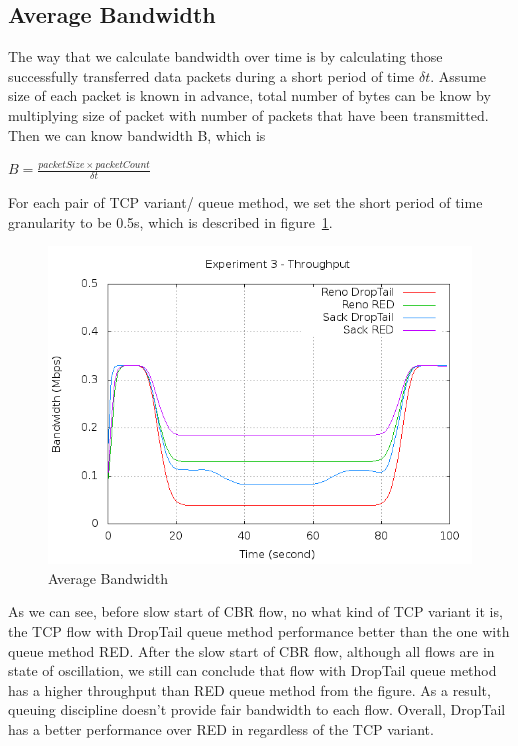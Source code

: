 \documentclass[10pt, conference]{lib/IEEEtran}
\begin{document}
\subsection{Average Bandwidth}
The way that we calculate bandwidth over time is by calculating those 
successfully transferred data packets during a short period of time 
$\delta t$. Assume size of each packet is known in advance, total 
number of bytes can be know by multiplying size of packet with number 
of packets that have been transmitted. Then we can know bandwidth B, 
which is  
\begin{center}
    $B = \frac{packetSize \times packetCount}{\delta t}$
\end{center}
For each pair of TCP variant/ queue method, we set the short period of time granularity to be 0.5s, which is described in figure~\ref{fig:exp3-thp}.\\
\begin{figure}[!htb]
    \centering
    \includegraphics[width=1.0\linewidth]{plot/exp3-thp.png}
    \caption{Average Bandwidth}
    \label{fig:exp3-thp}
\end{figure}
As we can see, before slow start of CBR flow, no what kind of TCP 
variant it is, the TCP flow with DropTail queue method performance 
better than the one with queue method RED. After the slow start of CBR 
flow, although all flows are in state of oscillation, we still can 
conclude that flow with DropTail queue method has a higher throughput 
than RED queue method from the figure. As a result, queuing discipline 
doesn’t provide fair bandwidth to each flow. Overall, DropTail has a 
better performance over RED in regardless of the TCP variant.
\end{document}
